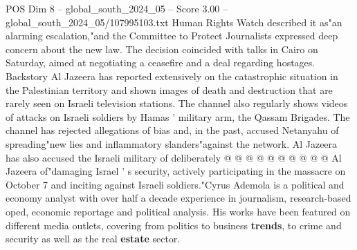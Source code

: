 \begin{textsample}{POS Dim 8 – global\_south\_2024\_05 – Score 3.00 – global\_south\_2024\_05/107995103.txt}
Human Rights Watch described it as"an alarming escalation,"and the Committee to Protect Journalists expressed deep concern about the new law.
The decision coincided with talks in Cairo on Saturday, aimed at negotiating a ceasefire and a deal regarding hostages.
Backstory Al Jazeera has reported extensively on the catastrophic situation in the Palestinian territory and shown images of death and destruction that are rarely seen on Israeli television stations.
The channel also regularly shows videos of attacks on Israeli soldiers by Hamas ' military arm, the Qassam Brigades.
The channel has rejected allegations of bias and, in the past, accused Netanyahu of spreading"new lies and inflammatory slanders"against the network.
Al Jazeera has also accused the Israeli military of deliberately @ @ @ @ @ @ @ @ @ @ Al Jazeera of"damaging Israel ' s security, actively participating in the massacre on October 7 and inciting against Israeli soldiers."Cyrus Ademola is a political and economy analyst with over half a decade experience in journalism, research-based oped, economic reportage and political analysis.
His works have been featured on different media outlets, covering from politics to business \textbf{trends}, to crime and security as well as the real \textbf{estate} sector.

\end{textsample}
